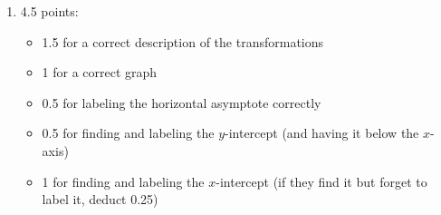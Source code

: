 \documentclass{article}
\providecommand{\check}{}
\renewcommand{\check}{\ifmmode{\text{ \ding{51} }}\else{\ding{51} }\fi}
\begin{document}
\begin{enumerate}
\begin{enumerate}
    \begin{problem}[\nstretch{1.25}]
      Sketch a graph of $f$ that's consistent with everything you've done. (You need not show the concavity accurately.) 
    \end{problem}

    \begin{solution}
      \begin{center}
      \end{center}
    \end{solution}

  \item

    \begin{grading}
      2 points
    \end{grading}

    \begin{problem}[\vfill]
      Does $f$ have a global maximum on $[-2, 2]$? If so, what's the global maximum value (the $y$-value), and where is it achieved (at what $x$)? If not, why not? How about a global minimum?
    \end{problem}

    \begin{solution}
      On $[-2, 2]$, $f$ does not have a global minimum or a global maximum. We know
      this because $\lim\limits_{x \to 0^-} f(x) = -\infty$ 
      and $\lim\limits_{x \to 0^+} f(x) = \infty$.
    \end{solution}

  \end{enumerate}

  \begin{problemonly}
    \check Is everything you've done in this problem consistent? 
  \end{problemonly}

\item  
  \begin{grading}
    4.5 points:
    \begin{itemize}[nosep]
    \item 1.5 for a correct description of the transformations
    \item 1 for a correct graph
    \item 0.5 for labeling the horizontal asymptote correctly
    \item 0.5 for finding and labeling the $y$-intercept (and having it below the $x$-axis)
    \item 1 for finding and labeling the $x$-intercept (if they find it but forget to label it, deduct 0.25)
    \end{itemize}
  \end{grading}


\end{enumerate}
\end{document}
